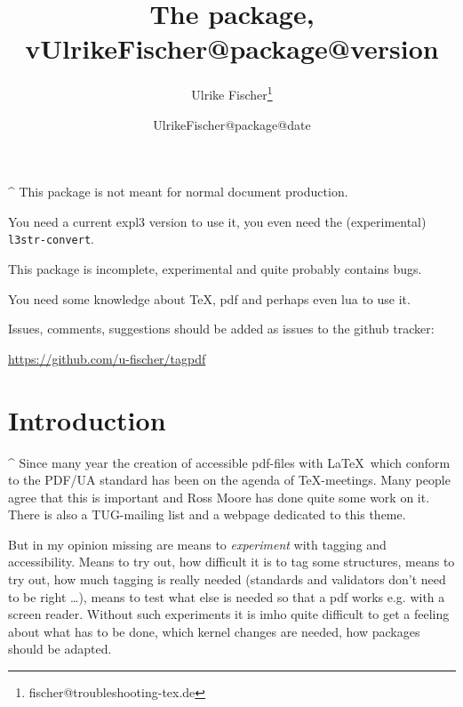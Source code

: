 \documentclass[DIV=12,parskip=half-,bibliography=totoc]{scrartcl}
\title{The \pkg{tagpdf} package, v\csname UlrikeFischer@package@version\endcsname}
\date{\csname UlrikeFischer@package@date\endcsname}
\author{Ulrike Fischer\thanks{fischer@troubleshooting-tex.de}}
\begin{document}

 \maketitle
 \tagmcend
\tagstructend

\begin{tcolorbox}[colframe=red]
\TagP^ This package is not meant for normal document production.

\TagP You need a current expl3 version to use it, you even need the (experimental) \texttt{l3str-convert}.

\TagP This package is incomplete, experimental and quite probably contains bugs.

\TagP You need some knowledge about \TeX, pdf and perhaps even lua to use it.

\medskip

\TagP Issues, comments, suggestions should be added as issues to the github tracker:\TagPend

\medskip
\centering \url{https://github.com/u-fischer/tagpdf}


\tagstructend
\end{tcolorbox}


\begin{NoHyper} %
\tableofcontents
\end{NoHyper}

\section{Introduction}


\TagP^ Since many year the creation of accessible pdf-files with \LaTeX\ which conform to the PDF/UA standard has been on the agenda of \TeX-meetings. Many people agree that this is important and Ross Moore has done quite some work on it. There is also a TUG-mailing list and a webpage \parencite{tugaccess} dedicated to this theme.

\TagP But in my opinion missing are means to \emph{experiment} with tagging and accessibility. Means to try out, how difficult it is to tag some structures, means to try out, how much tagging is really needed (standards and validators don't need to be right \ldots), means to test what else is needed so that a pdf works e.g. with a screen reader. Without such experiments it is imho quite difficult to get a feeling about what has to be done, which kernel changes are needed, how packages should be adapted.
\end{document}

